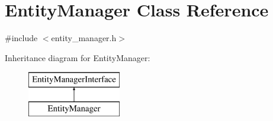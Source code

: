 \hypertarget{classEntityManager}{\section{Entity\-Manager Class Reference}
\label{classEntityManager}
}


{\ttfamily \#include $<$entity\-\_\-manager.\-h$>$}

Inheritance diagram for Entity\-Manager\-:\begin{figure}[H]
\begin{center}
\leavevmode
\includegraphics[height=2.000000cm]{classEntityManager}
\end{center}
\end{figure}
